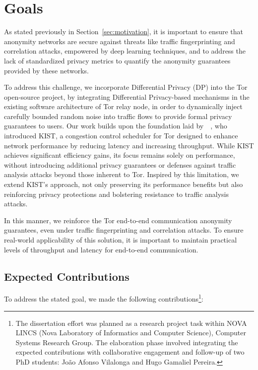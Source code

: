 \section{Goals}\label{sec:goals}

As stated previously in Section~\ref{sec:motivation}, it is important to ensure that anonymity networks are secure against threats like traffic fingerprinting and correlation attacks, empowered by deep learning techniques, and to address the lack of standardized privacy metrics to quantify the anonymity guarantees provided by these networks.

To address this challenge, we incorporate Differential Privacy (DP) into the Tor open-source project, by integrating Differential Privacy-based mechanisms in the existing software architecture of Tor relay node, in order to dynamically inject carefully bounded random noise into traffic flows to provide formal privacy guarantees to users. 
Our work builds upon the foundation laid by~\citeauthor{KIST}~\cite{KIST}, who introduced KIST, a congestion control scheduler for Tor designed to enhance network performance by reducing latency and increasing throughput. While KIST achieves significant efficiency gains, its focus remains solely on performance, without introducing additional privacy guarantees or defenses against traffic analysis attacks beyond those inherent to Tor. Inspired by this limitation, we extend KIST's approach, not only preserving its performance benefits but also reinforcing privacy protections and bolstering resistance to traffic analysis attacks.

In this manner, we reinforce the Tor end-to-end communication anonymity guarantees, even under traffic fingerprinting and correlation attacks. To ensure real-world applicability of this solution, it is important to maintain practical levels of throughput and latency for end-to-end communication. 

\subsection{Expected Contributions}\label{sub:contributions}

To address the stated goal, we made the following contributions\footnote{The dissertation effort was planned as a research project task within NOVA LINCS (Nova Laboratory of Informatics and Computer Science), Computer Systems Research Group. The elaboration phase involved integrating the expected contributions with collaborative engagement and follow-up of two PhD students: João Afonso Vilalonga and Hugo Gamaliel Pereira.}:

